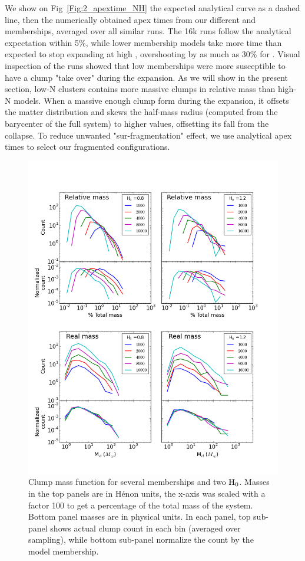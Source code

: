 We show on Fig~\ref{Fig:2_apextime_NH} the expected analytical curve as a dashed line, then the numerically obtained apex times from our different \tHub and memberships, averaged over all similar runs. The 16k runs follow the analytical expectation within 5\%, while lower membership models take more time than expected to stop expanding at high \tHub, overshooting by as much as 30\% for . Visual inspection of the runs showed that low memberships were more susceptible to have a clump "take over" during the expansion. As we will show in the present section, low-N clusters contains more massive clumps in relative mass than high-N models. When a massive enough clump form during the expansion, it offsets the matter distribution and skews the half-mass radius (computed from the barycenter of the full system) to higher values, offsetting its fall from the collapse. To reduce unwanted "sur-fragmentation" effect, we use analytical apex times to select our fragmented configurations.  


\begin{figure}
\begin{center}
\includegraphics[width=\columnwidth]{Figures/2_ClumpMF_N.png}
\end{center}
\caption{Clump mass function for several memberships and two ${\textrm{H}}_0$. Masses in the top panels are in H\'enon units, the x-axis was scaled with a factor 100 to get a percentage of the total mass of the system. Bottom panel masses are in physical units. In each panel, top sub-panel shows actual clump count in each bin (averaged over sampling), while bottom sub-panel normalize the count by the model membership. }
\label{Fig:2_ClumpMF_N}
\end{figure} 


